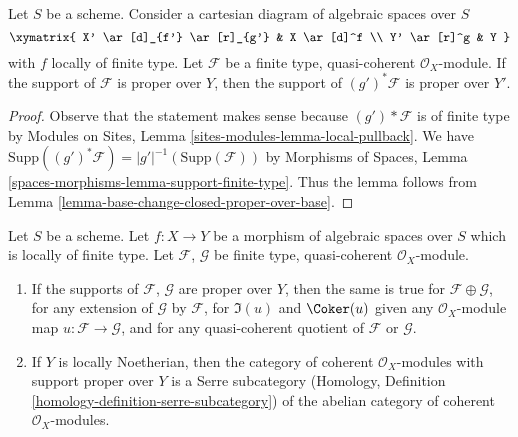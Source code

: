 \begin{lemma}
\label{lemma-base-change-module-support-proper-over-base}
Let $S$ be a scheme.
Consider a cartesian diagram of algebraic spaces over $S$
$$
\xymatrix{
X' \ar[d]_{f'} \ar[r]_{g'} & X \ar[d]^f \\
Y' \ar[r]^g & Y
}
$$
with $f$ locally of finite type. Let $\mathcal{F}$ be a
finite type, quasi-coherent $\mathcal{O}_X$-module.
If the support of $\mathcal{F}$ is proper over $Y$, then
the support of $(g')^*\mathcal{F}$ is proper over $Y'$.
\end{lemma}

\begin{proof}
Observe that the statement makes sense because
$(g')*\mathcal{F}$ is of finite type by
Modules on Sites, Lemma \ref{sites-modules-lemma-local-pullback}.
We have $\text{Supp}((g')^*\mathcal{F}) = |g'|^{-1}(\text{Supp}(\mathcal{F}))$
by Morphisms of Spaces, Lemma \ref{spaces-morphisms-lemma-support-finite-type}.
Thus the lemma follows from
Lemma \ref{lemma-base-change-closed-proper-over-base}.
\end{proof}

\begin{lemma}
\label{lemma-cat-module-support-proper-over-base}
Let $S$ be a scheme.
Let $f : X \to Y$ be a morphism of algebraic spaces over $S$
which is locally of finite type. Let $\mathcal{F}$, $\mathcal{G}$
be finite type, quasi-coherent $\mathcal{O}_X$-module.
\begin{enumerate}
\item If the supports of $\mathcal{F}$, $\mathcal{G}$
are proper over $Y$, then the same is true
for $\mathcal{F} \oplus \mathcal{G}$, for any extension
of $\mathcal{G}$ by $\mathcal{F}$, for $\Im(u)$ and $\Coker(u)$
given any $\mathcal{O}_X$-module map $u : \mathcal{F} \to \mathcal{G}$,
and for any quasi-coherent quotient of $\mathcal{F}$ or $\mathcal{G}$.
\item If $Y$ is locally Noetherian, then the category of
coherent $\mathcal{O}_X$-modules with support proper over
$Y$ is a Serre subcategory (Homology, Definition
\ref{homology-definition-serre-subcategory})
of the abelian category of
coherent $\mathcal{O}_X$-modules.
\end{enumerate}
\end{lemma}

